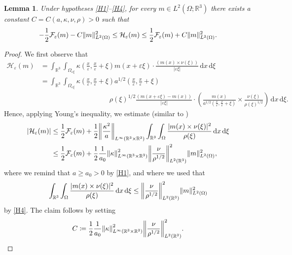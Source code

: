 \documentclass[reqno,11pt]{amsart}
\numberwithin{equation}{section}
\theoremstyle{thmlemcorr}
\numberwithin{theorem}{section}
\newtheorem{lemma}[theorem]{Lemma}
\theoremstyle{thmlemcorr*}
\theoremstyle{defi}
\theoremstyle{remexample}
\theoremstyle{ass}
\newcommand{\R}{\mathbb{R}}
\newcommand{\Fcal}{\mathcal{F}}
\newcommand{\Hcal}{\mathcal{H}}
\renewcommand{\epsilon}{\varepsilon}
\newcommand{\dd}{\,\mathrm{d}}
\DeclarePairedDelimiter{\norm}{\lVert}{\rVert}
\newcommand{\1}{\mathds{1}}
\newcommand{\Om}{\Omega}
\newcommand{\veps}{\varepsilon}
\begin{document}
\begin{lemma}\label{lem:antisym_by_sym}
    Under hypotheses \ref{H1}--\ref{H4}, for every $m \in L^2(\Om; \R^3)$ there exists a constant \(C = C (a,\kappa, \nu, \rho) >0\) such that
    \begin{align*}
        -\frac{1}{2}\Fcal_\epsilon(m)
        -C\norm{m}_{L^2(\Omega)}^2
        \le\Hcal_\epsilon(m) 
        \le \frac{1}{2}\Fcal_\epsilon(m)
        +C\norm{m}_{L^2(\Omega)}^2.
    \end{align*}
\end{lemma}
\begin{proof}
We first observe that
\begin{align*}
    \Hcal_\epsilon(m) 
     &=\int_{\R^3 } \int_{\Omega_{\veps \xi}} 
    \kappa \left(\frac{x}{\epsilon},\frac{x}{\epsilon} + \xi \right)
    m(x+\veps\xi) \cdot\frac{( m(x)\times \nu(\xi))}{|\veps \xi|}\dd x\dd \xi\\
    & =\int_{\R^3 } \int_{\Omega_{\veps \xi}} 
    \kappa \left(\frac{x}{\epsilon},\frac{x}{\epsilon} + \xi \right) a^{1/2} \left(\frac{x}{\epsilon},\frac{x}{\epsilon} + \xi \right)
    \\
    &\qquad\qquad\qquad\qquad\qquad\rho(\xi)^{1/2}\frac{(m(x+\veps\xi)-m(x))}{|\veps \xi|}
    \cdot\left( \frac{m(x)}{a^{1/2} \left(\frac{x}{\epsilon},\frac{x}{\epsilon} + \xi \right)}\times \frac{\nu(\xi)}{\rho(\xi)^{1/2} }\right)\dd x\dd \xi.
\end{align*}
Hence, applying Young's inequality, we estimate (similar to \cite[Theorem~2.2, Step 2]{DDG24})
\begin{align}
\begin{split}
    |\Hcal_\epsilon(m)|
    &\le \frac{1}{2}\Fcal_\epsilon(m)
    +\frac{1}{2}\norm*{\frac{\kappa^2}{a}}_{L^\infty(\R^3\times \R^3)}
    \int_{\R^3}\int_\Om
    \frac{|m(x)\times \nu(\xi)|^2}{\rho(\xi)}  \dd x \dd \xi\\
    &\le \frac{1}{2}\Fcal_\epsilon(m)
    +\frac{1}{2}\frac{1}{a_0}\norm*{\kappa}^2_{L^\infty(\R^3\times \R^3)}\norm*{\frac{\nu}{\rho^{1/2}}}^{2}_{L^{2}(\R^3)}\norm{m}^2_{L^2(\Om)},
\end{split}
\end{align}
where we remind that \(a\ge a_0>0\) by \ref{H1}, and where we used that
\begin{align*}
    \int_{\R^3}\int_\Om\frac{|m(x)\times \nu(\xi)|^2}{\rho(\xi)}  \dd x \dd \xi
    \le \norm*{\frac{\nu}{\rho^{1/2}}}^{2}_{L^{2}(\R^3)}\norm{m}^2_{L^2(\Om)}
\end{align*}
by \ref{H4}. %
The claim follows by %
setting
\begin{equation*}
    C
    \coloneqq  \frac{1}{2}\frac{1}{a_0}\norm*{\kappa}^2_{L^\infty(\R^3\times \R^3)}
    \norm*{\frac{\nu}{\rho^{1/2}}}^{2}_{L^{2}(\R^3)}.\qedhere
\end{equation*}
\end{proof}
\end{document}
